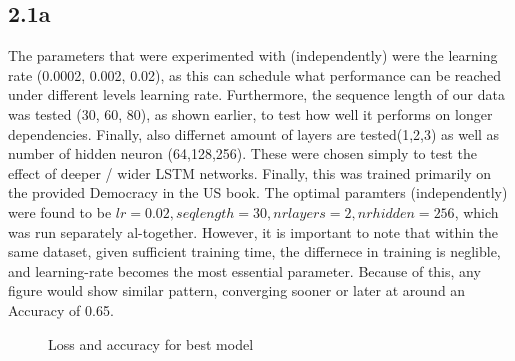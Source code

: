 \subsection*{2.1a}
The parameters that were experimented with (independently) were the 
learning rate (0.0002, 0.002, 0.02), as this
can schedule what performance can be reached under different levels learning rate. Furthermore,
the sequence length of our data was tested (30, 60, 80), as shown earlier, to test how well it performs
on longer dependencies. Finally, also differnet amount of layers are tested(1,2,3) as well as number of hidden neuron (64,128,256). 
These were chosen simply to test the effect of deeper / wider LSTM networks.
Finally, this was trained primarily on the provided Democracy in the US book. The optimal paramters (independently) were
found to be $lr=0.02, seqlength=30, nrlayers=2, nrhidden=256$, which was run separately al-together. However, it is important to note that within the same dataset,
given sufficient training time, the differnece in training is neglible, and learning-rate becomes the most essential parameter.
Because of this, any figure would show similar pattern, converging sooner or later at around an Accuracy of 0.65.

\begin{figure}%
    \centering
    \qquad
    \caption{Loss and accuracy for best model}%
    \label{fig:defaults}%
\end{figure}

